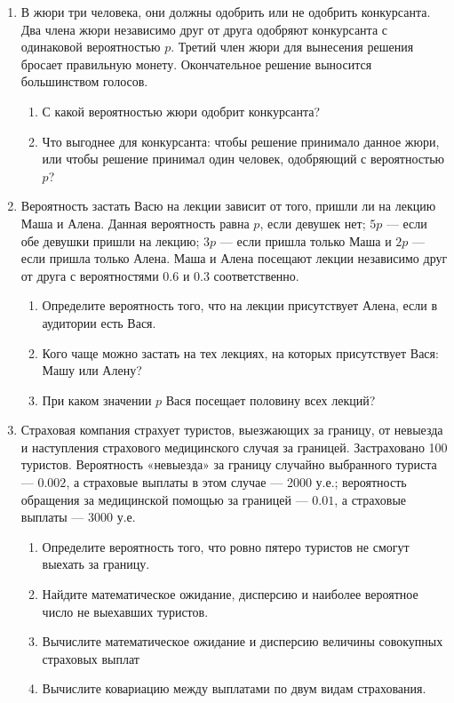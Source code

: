 \begin{enumerate}

\item В жюри три человека, они должны одобрить или не одобрить конкурсанта. Два члена жюри независимо друг от друга одобряют конкурсанта с одинаковой вероятностью $p$. Третий член жюри  для вынесения решения бросает правильную монету. Окончательное решение выносится большинством голосов.
\begin{enumerate}
\item С какой вероятностью жюри одобрит конкурсанта?
\item Что выгоднее для  конкурсанта: чтобы решение принимало данное жюри, или чтобы решение принимал один человек, одобряющий с вероятностью $p$?
\end{enumerate}


\item Вероятность застать Васю на лекции зависит от того, пришли ли на лекцию Маша и Алена. Данная вероятность равна $p$, если девушек нет; $5p$ — если обе девушки пришли на лекцию; $3p$ — если пришла только Маша и $2p$ — если пришла только Алена. Маша и Алена посещают лекции независимо друг от друга с вероятностями $0.6$ и $0.3$ соответственно.
\begin{enumerate}
\item Определите вероятность того, что на лекции присутствует Алена, если в аудитории есть Вася.
\item Кого чаще можно застать на тех лекциях, на которых присутствует Вася: Машу или Алену?
\item При каком значении $p$ Вася посещает половину всех лекций?
\end{enumerate}

\item Страховая компания страхует туристов, выезжающих за границу, от невыезда и наступления страхового медицинского случая за границей. Застраховано 100 туристов. Вероятность «невыезда» за границу случайно выбранного туриста — $0.002$, а страховые выплаты в этом случае — 2000 у.е.; вероятность обращения за медицинской помощью за границей — $0.01$, а страховые выплаты — 3000 у.е.
\begin{enumerate}
\item Определите вероятность того, что ровно пятеро туристов не смогут выехать за границу.
\item Найдите математическое ожидание, дисперсию и наиболее вероятное число не выехавших туристов.
\item Вычислите математическое ожидание и дисперсию величины совокупных страховых выплат
\item Вычислите ковариацию между выплатами по двум видам страхования.
\end{enumerate}


\end{enumerate}
